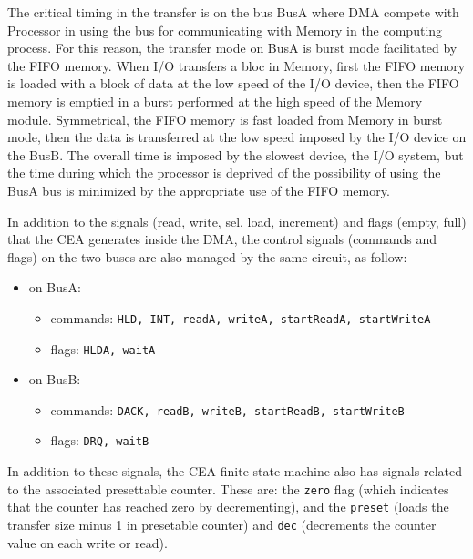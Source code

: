 The critical timing in the transfer is on the bus BusA where DMA compete with Processor in using the bus for communicating with Memory in the computing process. For this reason, the transfer mode on BusA is burst mode facilitated by the  FIFO memory. When I/O transfers a bloc in Memory, first the FIFO memory is loaded with a block of data at the low speed of the I/O device, then the FIFO memory is emptied in a burst performed at the high speed of the Memory module. Symmetrical, the FIFO memory is fast loaded from Memory in burst mode, then the data is transferred  at the low speed imposed by the I/O device on the BusB. The overall time is imposed by the slowest device, the I/O system, but the time during which the processor is deprived of the possibility of using the BusA bus is minimized by the appropriate use of the FIFO memory.

In addition to the signals (read, write, sel, load, increment) and flags (empty, full) that the CEA generates inside the DMA, the control signals (commands and flags) on the two buses are also managed by the same circuit, as follow:
\begin{itemize}
    \item on BusA:
        \begin{itemize}
            \item commands: {\tt HLD, INT, readA, writeA, startReadA, startWriteA}
            \item flags: {\tt HLDA, waitA}
        \end{itemize}
    \item on BusB:
        \begin{itemize}
            \item commands: {\tt DACK, readB, writeB, startReadB, startWriteB}
            \item flags: {\tt DRQ, waitB}
        \end{itemize}
\end{itemize}
In addition to these signals, the CEA finite state machine also has signals related to the associated presettable counter. These are: the {\tt zero} flag (which indicates that the counter has reached zero by decrementing), and the {\tt preset} (loads the transfer size minus 1 in presetable counter) and {\tt dec} (decrements the counter value on each write or read).

